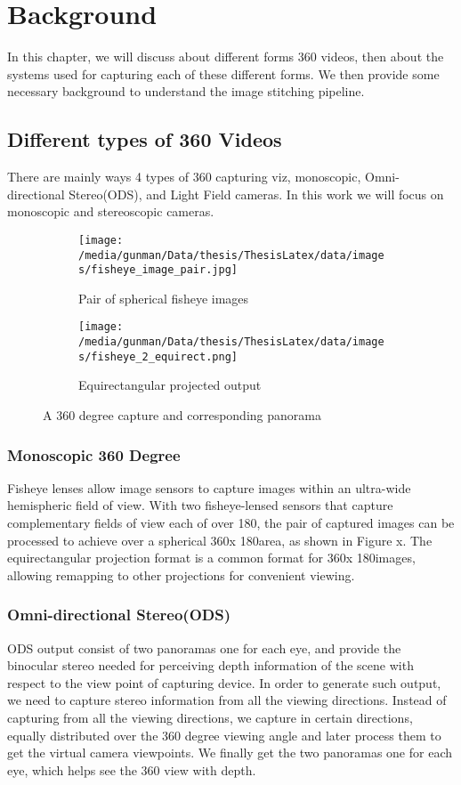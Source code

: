 \chapter{Background}
In this chapter, we will discuss about different forms 360 videos, then about the systems used for capturing each of these different forms. We then provide some necessary background to understand the image stitching pipeline.

\section{Different types of 360 Videos}
There are mainly ways 4 types of 360 capturing viz, monoscopic, Omni-directional Stereo(ODS), and Light Field cameras. In this work we will focus on monoscopic and stereoscopic cameras. 
\begin{figure}[h]
	\centering
	\begin{subfigure}{.5\textwidth}
		\centering
		\texttt{[image: /media/gunman/Data/thesis/ThesisLatex/data/images/fisheye\_image\_pair.jpg]}
		\caption{Pair of spherical fisheye images}
		\label{fig:sub1}
	\end{subfigure}%
	\begin{subfigure}{.5\textwidth}
		\centering
		\texttt{[image: /media/gunman/Data/thesis/ThesisLatex/data/images/fisheye\_2\_equirect.png]}
		\caption{Equirectangular projected output}
		\label{fig:sub2}
	\end{subfigure}
	\caption{A 360 degree capture and corresponding panorama}
	\label{fig:test}
\end{figure}
\subsection{Monoscopic 360 Degree}
Fisheye lenses allow image sensors to capture images within an ultra-wide hemispheric field of view. With two fisheye-lensed sensors that capture complementary fields of view each of over 180\textdegree , the pair of captured images can be processed to achieve over a spherical 360\textdegree  x 180\textdegree  area, as shown in Figure x. The equirectangular projection format is a common format for 360\textdegree  x 180\textdegree  images, allowing remapping to other projections for convenient viewing. 



\subsection{Omni-directional Stereo(ODS)}
ODS output consist of two panoramas one for each eye, and provide the binocular stereo needed for perceiving depth information of the scene with respect to the view point of capturing device. In order to generate such output, we need to capture stereo information from all the viewing directions. Instead of capturing from all the viewing directions, we capture in certain directions, equally distributed over the 360 degree viewing angle and later process them to get the virtual camera viewpoints. We finally get the two panoramas one for each eye, which helps see the 360 view with depth.

